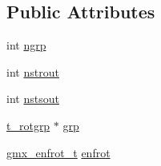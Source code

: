 \subsection*{\-Public \-Attributes}
\begin{DoxyCompactItemize}
\item 
int \hyperlink{structt__rot_abaeb9baacc26e365ee1a7e5ebd71fa52}{ngrp}
\item 
int \hyperlink{structt__rot_aa204c4d3663b7256bb59f665382ca36a}{nstrout}
\item 
int \hyperlink{structt__rot_ac5324149ef4f692fd449adfebd8aff8e}{nstsout}
\item 
\hyperlink{structt__rotgrp}{t\-\_\-rotgrp} $\ast$ \hyperlink{structt__rot_a39a14f527d58a2b2541e6f7138cce248}{grp}
\item 
\hyperlink{include_2types_2inputrec_8h_af6b04808f2ab66014e7194951ae414ef}{gmx\-\_\-enfrot\-\_\-t} \hyperlink{structt__rot_a62540f0817b4b5e8ec729ce62acb46ad}{enfrot}
\end{DoxyCompactItemize}


